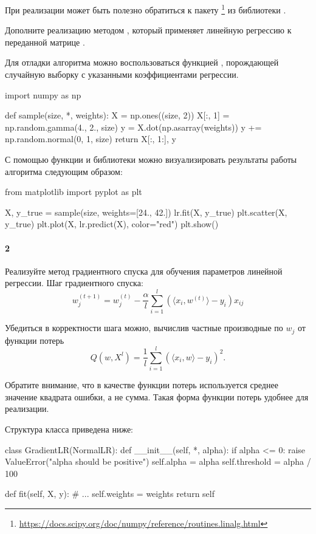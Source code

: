 \documentclass[a4paper,12pt]{article}
\begin{document}
При реализации может быть полезно обратиться к пакету   \footnote{\url{https://docs.scipy.org/doc/numpy/reference/routines.linalg.html}} из библиотеки .

Дополните реализацию методом , который применяет линейную
регрессию к переданной матрице .

Для отладки алгоритма можно воспользоваться функцией ,
порождающей случайную выборку с указанными коэффициентами регрессии.
\begin{python3}
import numpy as np


def sample(size, *, weights):
    X = np.ones((size, 2))
    X[:, 1] = np.random.gamma(4., 2., size)
    y = X.dot(np.asarray(weights))
    y += np.random.normal(0, 1, size)
    return X[:, 1:], y
\end{python3}


С помощью функции  и библиотеки 
можно визуализировать результаты работы алгоритма следующим образом:
\begin{python3}
from matplotlib import pyplot as plt


X, y_true = sample(size, weights=[24., 42.])
lr.fit(X, y_true)
plt.scatter(X, y_true)
plt.plot(X, lr.predict(X), color="red")
plt.show()
\end{python3}


\paragraph{2} Реализуйте метод градиентного спуска для обучения параметров
линейной регрессии. Шаг градиентного спуска:
$$
w^{(t + 1)}_j = w^{(t)}_j
- \frac{\alpha}{l} \sum\limits_{i = 1}^l \left(
      \langle x_i, w^{(t)} \rangle - y_i
  \right) x_{ij}
$$

Убедиться в корректности шага можно, вычислив частные производные по $w_j$ от
функции потерь
$$
Q(w, X^l) = \dfrac{1}{l}
\sum\limits_{i = 1}^l \left( \langle x_i, w \rangle - y_i \right)^2.
$$

Обратите внимание, что в качестве функции потерь используется среднее значение
квадрата ошибки, а не сумма. Такая форма функции потерь удобнее для реализации.

Структура класса приведена ниже:
\begin{python3}
class GradientLR(NormalLR):
    def __init__(self, *, alpha):
        if alpha <= 0:
            raise ValueError("alpha should be positive")
        self.alpha = alpha
        self.threshold = alpha / 100

    def fit(self, X, y):
        # ...
        self.weights = weights
        return self
\end{python3}
\end{document}
